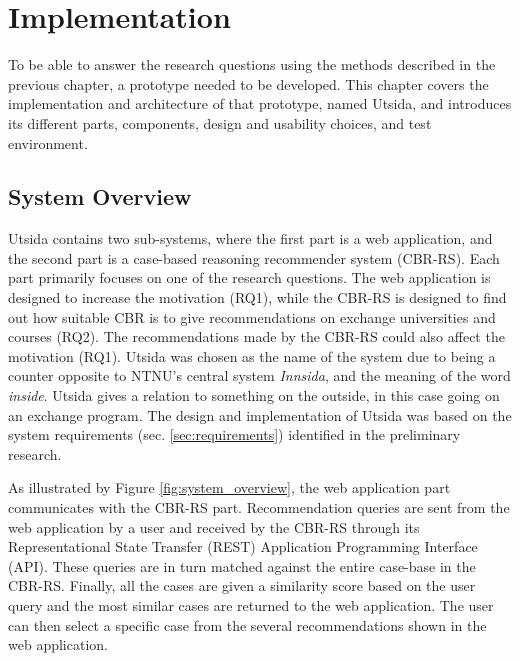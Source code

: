
\chapter{Implementation}\label{ch5:implementation}

To be able to answer the research questions using the methods described in the previous chapter, a prototype needed to be developed. This chapter covers the implementation and architecture of that prototype, named Utsida, and introduces its different parts, components, design and usability choices, and test environment.

\section{System Overview}

Utsida contains two sub-systems, where the first part is a web application, and the second part is a case-based reasoning recommender system (CBR-RS). Each part primarily focuses on one of the research questions. The web application is designed to increase the motivation (RQ1), while the CBR-RS is designed to find out how suitable CBR is to give recommendations on exchange universities and courses (RQ2). The recommendations made by the CBR-RS could also affect the motivation (RQ1). Utsida was chosen as the name of the system due to being a counter opposite to NTNU's central system \emph{Innsida}, and the meaning of the word \emph{inside}. Utsida gives a relation to something on the outside, in this case going on an exchange program. The design and implementation of Utsida was based on the system requirements (sec. \ref{sec:requirements}) identified in the preliminary research.

As illustrated by Figure \ref{fig:system_overview}, the web application part communicates with the CBR-RS part. Recommendation queries are sent from the web application by a user and received by the CBR-RS through its Representational State Transfer (REST) Application Programming Interface (API). These queries are in turn matched against the entire case-base in the CBR-RS. Finally, all the cases are given a similarity score based on the user query and the most similar cases are returned to the web application. The user can then select a specific case from the several recommendations shown in the web application.

